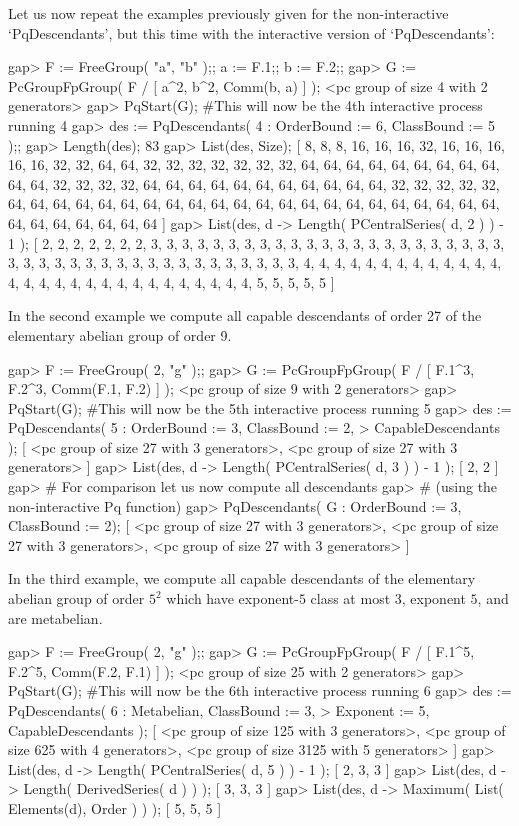 Let us now repeat the examples previously given for  the  non-interactive
`PqDescendants',  but  this  time  with  the   interactive   version   of
`PqDescendants':

\beginexample
gap> F := FreeGroup( "a", "b" );; a := F.1;; b := F.2;;
gap> G := PcGroupFpGroup( F / [ a^2, b^2, Comm(b, a) ] );
<pc group of size 4 with 2 generators>
gap> PqStart(G); #This will now be the 4th interactive process running
4
gap> des := PqDescendants( 4 : OrderBound := 6, ClassBound := 5 );;
gap> Length(des);
83
gap> List(des, Size);
[ 8, 8, 8, 16, 16, 16, 32, 16, 16, 16, 16, 16, 32, 32, 64, 64, 32, 32, 32, 
  32, 32, 32, 32, 64, 64, 64, 64, 64, 64, 64, 64, 64, 64, 64, 32, 32, 32, 32, 
  64, 64, 64, 64, 64, 64, 64, 64, 64, 64, 64, 32, 32, 32, 32, 32, 64, 64, 64, 
  64, 64, 64, 64, 64, 64, 64, 64, 64, 64, 64, 64, 64, 64, 64, 64, 64, 64, 64, 
  64, 64, 64, 64, 64, 64, 64 ]
gap> List(des, d -> Length( PCentralSeries( d, 2 ) ) - 1 );
[ 2, 2, 2, 2, 2, 2, 2, 3, 3, 3, 3, 3, 3, 3, 3, 3, 3, 3, 3, 3, 3, 3, 3, 3, 3, 
  3, 3, 3, 3, 3, 3, 3, 3, 3, 3, 3, 3, 3, 3, 3, 3, 3, 3, 3, 3, 3, 3, 3, 3, 4, 
  4, 4, 4, 4, 4, 4, 4, 4, 4, 4, 4, 4, 4, 4, 4, 4, 4, 4, 4, 4, 4, 4, 4, 4, 4, 
  4, 4, 4, 5, 5, 5, 5, 5 ]
\endexample

In the second example we compute all  capable descendants of order  27 of
the  elementary abelian group of order 9.  

\beginexample
gap> F := FreeGroup( 2, "g" );;                                 
gap> G := PcGroupFpGroup( F / [ F.1^3, F.2^3, Comm(F.1, F.2) ] );
<pc group of size 9 with 2 generators>
gap> PqStart(G); #This will now be the 5th interactive process running
5
gap> des := PqDescendants( 5 : OrderBound := 3, ClassBound := 2,
>                              CapableDescendants );
[ <pc group of size 27 with 3 generators>, 
  <pc group of size 27 with 3 generators> ]
gap> List(des, d -> Length( PCentralSeries( d, 3 ) ) - 1 );
[ 2, 2 ]
gap> # For comparison let us now compute all descendants
gap> # (using the non-interactive Pq function)
gap> PqDescendants( G : OrderBound := 3, ClassBound := 2);
[ <pc group of size 27 with 3 generators>, 
  <pc group of size 27 with 3 generators>, 
  <pc group of size 27 with 3 generators> ]
\endexample

In  the  third  example,  we  compute  all  capable  descendants  of  the
elementary abelian group of order  $5^2$ which have exponent-$5$ class at
most $3$, exponent $5$, and are metabelian.

\beginexample
gap> F := FreeGroup( 2, "g" );;
gap> G := PcGroupFpGroup( F / [ F.1^5, F.2^5, Comm(F.2, F.1) ] );
<pc group of size 25 with 2 generators>
gap> PqStart(G); #This will now be the 6th interactive process running
6
gap> des := PqDescendants( 6 : Metabelian, ClassBound := 3,
>                              Exponent := 5, CapableDescendants );
[ <pc group of size 125 with 3 generators>, 
  <pc group of size 625 with 4 generators>, 
  <pc group of size 3125 with 5 generators> ]
gap> List(des, d -> Length( PCentralSeries( d, 5 ) ) - 1 );
[ 2, 3, 3 ]
gap> List(des, d -> Length( DerivedSeries( d ) ) );
[ 3, 3, 3 ]
gap> List(des, d -> Maximum( List( Elements(d), Order ) ) );
[ 5, 5, 5 ]
\endexample

